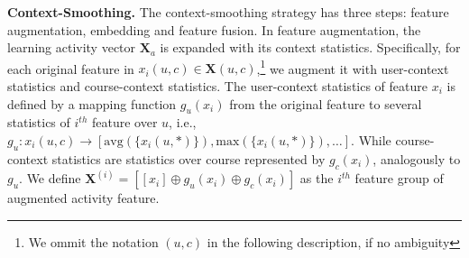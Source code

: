\textbf{Context-Smoothing.} The context-smoothing strategy has three steps: feature augmentation, embedding and feature fusion.
In feature augmentation, the learning activity vector $\mathbf{X}_a$ is expanded with its context statistics. 
Specifically, for each original feature in $x_i(u,c) \in \textbf{X}(u,c)$,\footnote{We ommit the notation $(u,c)$ in the following description, if no ambiguity} we augment it with user-context statistics and course-context statistics. The user-context statistics of feature $x_i$ is defined by a mapping function $g_u(x_i)$ from the original feature to several statistics of $i^{th}$ feature over $u$, i.e., $g_u: x_i(u,c) \rightarrow [\text{avg}(\{x_i(u,*)\}), \text{max}(\{x_i(u,*)\}),\ldots]$. While course-context statistics are statistics over course represented by $g_c(x_i)$, analogously to $g_u$. We define $\mathbf{X}^{(i)}=[[x_i] \oplus g_u(x_i) \oplus g_c(x_i)]$ as the $i^{th}$ feature group of augmented activity feature.

